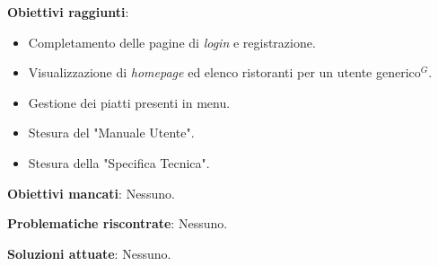 \textbf{Obiettivi raggiunti}:
\begin{itemize}
	\item Completamento delle pagine di \textit{login} e registrazione.
	\item Visualizzazione di \textit{homepage} ed elenco ristoranti per un utente generico$^G$.
	\item Gestione dei piatti presenti in menu.
	\item Stesura del "Manuale Utente".
	\item Stesura della "Specifica Tecnica".
\end{itemize}

\textbf{Obiettivi mancati}: Nessuno.

\textbf{Problematiche riscontrate}: Nessuno.

\textbf{Soluzioni attuate}: Nessuno.